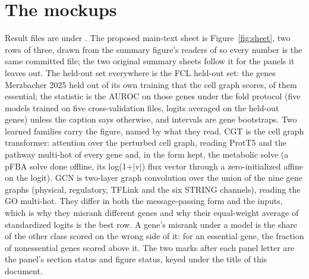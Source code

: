 
\section{The mockups}
\label{sec:mockups}

Result files are under . The proposed
main-text sheet is Figure~\ref{fig:sheet}, two rows of three, drawn from the summary
figure's readers of  so every number is the same committed
file; the two original summary sheets follow it for the panels it leaves out. The
held-out set everywhere is the FCL held-out set: the \gnHeldOut{} genes Merzbacher 2025
held out of its own training that the cell graph scores, \gnEssentialHeldOut{} of them
essential; the statistic is the AUROC on those genes under the fold protocol (five
models trained on five cross-validation files, logits averaged on the held-out genes)
unless the caption says otherwise, and intervals are gene bootstraps. Two learned
families carry the figure, named by what they read. CGT is the cell graph transformer:
attention over the perturbed cell graph, reading ProtT5 and the pathway multi-hot of
every gene and, in the form kept, the metabolic solve (a pFBA solve done offline, its
log(1+|v|) flux vector through a zero-initialized affine on the logit). GCN is two-layer
graph convolution over the union of the nine gene graphs (physical, regulatory, TFLink
and the six STRING channels), reading the GO multi-hot. They differ in both the
message-passing form and the inputs, which is why they misrank different genes and why
their equal-weight average of standardized logits is the best row. A gene's misrank
under a model is the share of the other class scored on the wrong side of it: for an
essential gene, the fraction of nonessential genes scored above it. The two marks after
each panel letter are the panel's section status and figure status, keyed under the
title of this document.

